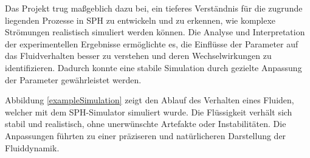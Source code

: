 \documentclass[a4paper, 12pt]{article}
\begin{document}
Das Projekt trug maßgeblich dazu bei, ein tieferes Verständnis für die zugrunde liegenden Prozesse in SPH zu entwickeln und zu erkennen, wie komplexe Strömungen realistisch simuliert werden können. Die Analyse und Interpretation der experimentellen Ergebnisse ermöglichte es, die Einflüsse der Parameter auf das Fluidverhalten besser zu verstehen und deren Wechselwirkungen zu identifizieren. Dadurch konnte eine stabile Simulation durch gezielte Anpassung der Parameter gewährleistet werden.

Abbildung \ref{exampleSimulation} zeigt den Ablauf des Verhalten eines Fluiden, welcher mit dem SPH-Simulator simuliert wurde. Die Flüssigkeit verhält sich stabil und realistisch, ohne unerwünschte Artefakte oder Instabilitäten. Die Anpassungen führten zu einer präziseren und natürlicheren Darstellung der Fluiddynamik.
\end{document}
